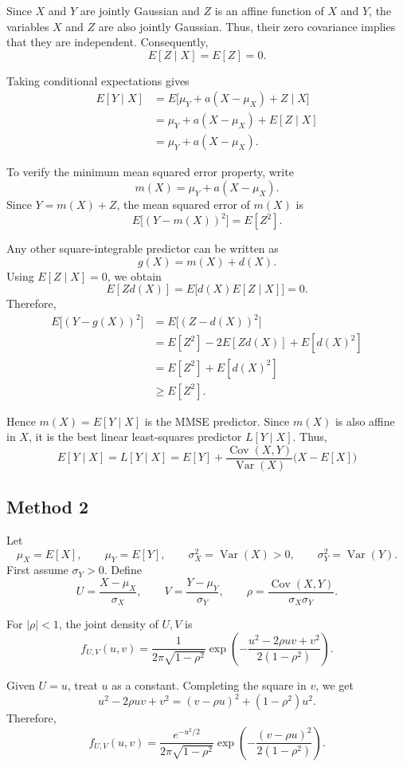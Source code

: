 \documentclass[11pt,a4paper]{article}
\begin{document}
Since \(X\) and \(Y\) are jointly Gaussian and \(Z\) is an
affine function of \(X\) and \(Y\), the variables \(X\) and \(Z\)
are also jointly Gaussian. Thus, their zero covariance implies
that they are independent. Consequently,
\[
E[Z\mid X]=E[Z]=0.
\]

Taking conditional expectations gives
\begin{align*}
E[Y\mid X]
&= E\bigl[\mu_Y+a(X-\mu_X)+Z\mid X\bigr]\\
&= \mu_Y+a(X-\mu_X)+E[Z\mid X]\\
&= \mu_Y+a(X-\mu_X).
\end{align*}

To verify the minimum mean squared error property, write
\[
m(X)=\mu_Y+a(X-\mu_X).
\]
Since \(Y=m(X)+Z\), the mean squared error of \(m(X)\) is
\[
E\bigl[(Y-m(X))^2\bigr]=E[Z^2].
\]

Any other square-integrable predictor can be written as
\[
g(X)=m(X)+d(X).
\]
Using \(E[Z\mid X]=0\), we obtain
\[
E[Zd(X)]
=E\bigl[d(X)E[Z\mid X]\bigr]
=0.
\]
Therefore,
\begin{align*}
E\bigl[(Y-g(X))^2\bigr]
&=E\bigl[(Z-d(X))^2\bigr]\\
&=E[Z^2]-2E[Zd(X)]+E[d(X)^2]\\
&=E[Z^2]+E[d(X)^2]\\
&\geq E[Z^2].
\end{align*}

Hence \(m(X)=E[Y\mid X]\) is the MMSE predictor.
Since \(m(X)\) is also affine in \(X\), it is the best linear
least-squares predictor \(L[Y\mid X]\). Thus,
\[
E[Y\mid X]
=
L[Y\mid X]
=
E[Y]
+
\frac{\operatorname{Cov}(X,Y)}{\operatorname{Var}(X)}
\bigl(X-E[X]\bigr)
\]
\subsection*{Method 2}
Let
\[
\mu_X=E[X], \qquad \mu_Y=E[Y], \qquad
\sigma_X^2=\operatorname{Var}(X)>0, \qquad
\sigma_Y^2=\operatorname{Var}(Y).
\]
First assume \(\sigma_Y>0\). Define
\[
U=\frac{X-\mu_X}{\sigma_X},
\qquad
V=\frac{Y-\mu_Y}{\sigma_Y},
\qquad
\rho=\frac{\operatorname{Cov}(X,Y)}{\sigma_X\sigma_Y}.
\]

For \(|\rho|<1\), the joint density of \(U,V\) is
\[
f_{U,V}(u,v)
=
\frac{1}{2\pi\sqrt{1-\rho^2}}
\exp\left(
-\frac{u^2-2\rho uv+v^2}{2(1-\rho^2)}
\right).
\]

Given \(U=u\), treat \(u\) as a constant.
Completing the square in \(v\), we get
\[
u^2-2\rho uv+v^2
=(v-\rho u)^2+(1-\rho^2)u^2.
\]
Therefore,
\[
f_{U,V}(u,v)
=
\frac{e^{-u^2/2}}{2\pi\sqrt{1-\rho^2}}
\exp\left(
-\frac{(v-\rho u)^2}{2(1-\rho^2)}
\right).
\]
\end{document}
